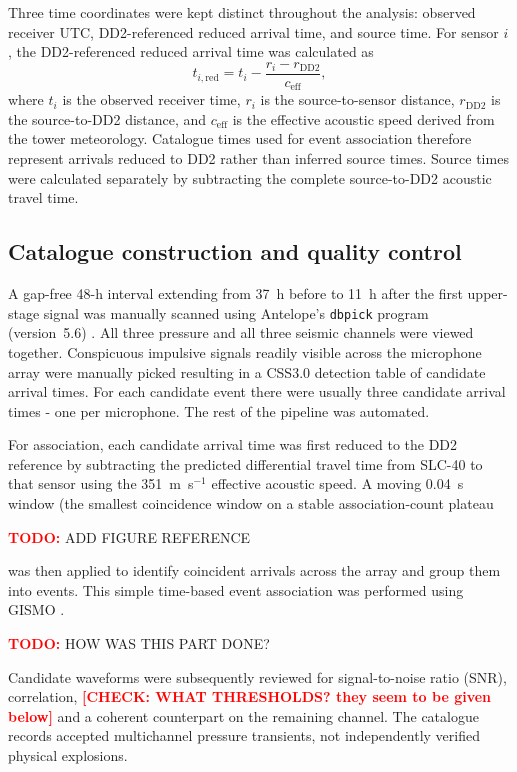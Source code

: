 \documentclass[]{seismica}
\newcommand{\todo}[1]{%
  \par\noindent
  \colorbox{yellow!40}{%
    \parbox{0.96\linewidth}{%
      \textbf{\textcolor{red}{TODO:}} #1
    }%
  }%
  \par
}
\newcommand{\checkme}[1]{\textcolor{red}{\textbf{[CHECK: #1]}}}
\begin{document}
Three time coordinates were kept distinct throughout the analysis: observed
receiver UTC, DD2-referenced reduced arrival time, and source time. For sensor
$i$, the DD2-referenced reduced arrival time was calculated as
\begin{equation}
 t_{i,\mathrm{red}}=t_i-\frac{r_i-r_{\mathrm{DD2}}}{c_{\mathrm{eff}}},
 \label{eq:reduced_time}
\end{equation}
where $t_i$ is the observed receiver time, $r_i$ is the source-to-sensor
distance, $r_{\mathrm{DD2}}$ is the source-to-DD2 distance, and
$c_{\mathrm{eff}}$ is the effective acoustic speed derived from the tower
meteorology. Catalogue times used for event association therefore represent
arrivals reduced to DD2 rather than inferred source times. Source times were
calculated separately by subtracting the complete source-to-DD2 acoustic
travel time.

\subsection{Catalogue construction and quality control}

A gap-free 48-h interval extending from 37~h before to 11~h after the first
upper-stage signal was manually scanned using
Antelope's \texttt{dbpick} program (version~5.6) \citep{brtt_antelope}. All three pressure and all three seismic
channels were viewed together. Conspicuous impulsive signals readily
visible across the microphone array were manually picked resulting in a CSS3.0 detection table of candidate arrival times.
For each candidate event there were usually three candidate arrival times - one per microphone. The rest of the pipeline was automated. 

For association, each candidate arrival time was first reduced to the DD2 reference by
subtracting the predicted differential travel time from SLC-40 to that sensor
using the 351~m~s$^{-1}$ effective acoustic speed. A moving 0.04~s window (the smallest coincidence
window on a stable association-count plateau \todo{ADD FIGURE REFERENCE} was then applied to identify coincident 
arrivals across the array and group them into events. This simple time-based event association was performed 
using GISMO \citep{thompson_gismo_2017}. 

\todo{HOW WAS THIS PART DONE?} Candidate waveforms were subsequently reviewed for signal-to-noise ratio (SNR),
correlation, \checkme{WHAT THRESHOLDS? they seem to be given below} and a coherent counterpart on the remaining channel. The
catalogue records accepted multichannel pressure transients, not independently
verified physical explosions.
\end{document}
